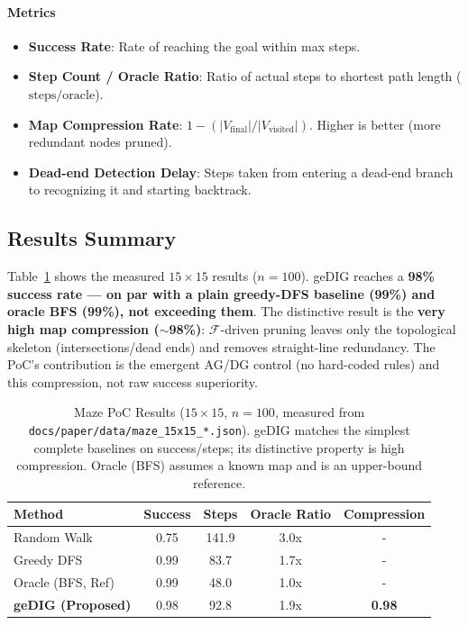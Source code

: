 \documentclass[12pt]{article}
\newcommand{\F}{\mathcal{F}}
\begin{document}
\paragraph{Metrics}\;
\begin{itemize}
    \item \textbf{Success Rate}: Rate of reaching the goal within max steps.
    \item \textbf{Step Count / Oracle Ratio}: Ratio of actual steps to shortest path length ($\mathrm{steps}/\mathrm{oracle}$).
    \item \textbf{Map Compression Rate}: $1 - (|V_{\mathrm{final}}| / |V_{\mathrm{visited}}|)$. Higher is better (more redundant nodes pruned).
    \item \textbf{Dead-end Detection Delay}: Steps taken from entering a dead-end branch to recognizing it and starting backtrack.
\end{itemize}

\subsection{Results Summary}
Table~\ref{tab:maze_main_result} shows the measured $15{\times}15$ results ($n{=}100$).
geDIG reaches a \textbf{98\% success rate --- on par with a plain greedy-DFS baseline (99\%) and oracle BFS (99\%), not exceeding them}.
The distinctive result is the \textbf{very high map compression ($\sim$98\%)}: $\F$-driven pruning leaves only the topological skeleton (intersections/dead ends) and removes straight-line redundancy. The PoC's contribution is the emergent AG/DG control (no hard-coded rules) and this compression, not raw success superiority.

\begin{table}[H]
    \centering
    \caption{Maze PoC Results ($15{\times}15$, $n{=}100$, measured from \texttt{docs/paper/data/maze\_15x15\_*.json}). geDIG matches the simplest complete baselines on success/steps; its distinctive property is high compression. Oracle (BFS) assumes a known map and is an upper-bound reference.}
    \label{tab:maze_main_result}
    \small
    \begin{tabular}{lcccc}
    \toprule
    Method & Success & Steps & Oracle Ratio & Compression \\
    \midrule
    Random Walk & 0.75 & 141.9 & 3.0x & - \\
    Greedy DFS & 0.99 & 83.7 & 1.7x & - \\
    Oracle (BFS, Ref) & 0.99 & 48.0 & 1.0x & - \\
    \textbf{geDIG (Proposed)} & 0.98 & 92.8 & 1.9x & \textbf{0.98} \\
    \bottomrule
    \end{tabular}
\end{table}
\end{document}

